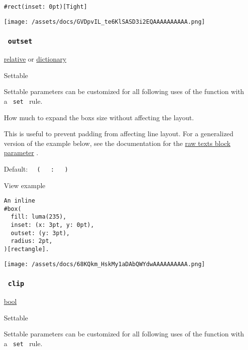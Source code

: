 \begin{verbatim}
#rect(inset: 0pt)[Tight]
\end{verbatim}

\texttt{[image: /assets/docs/GVDpvIL\_te6KlSASD3i2EQAAAAAAAAAA.png]}

\subsubsection{\texorpdfstring{\texttt{\ outset\ }}{ outset }}\label{parameters-outset}

\href{/docs/reference/layout/relative/}{relative} {or}
\href{/docs/reference/foundations/dictionary/}{dictionary}

{{ Settable }}

\label{parameters-outset-settable-tooltip}
Settable parameters can be customized for all following uses of the
function with a \texttt{\ set\ } rule.

How much to expand the box\textquotesingle s size without affecting the
layout.

This is useful to prevent padding from affecting line layout. For a
generalized version of the example below, see the documentation for the
\href{/docs/reference/text/raw/\#parameters-block}{raw
text\textquotesingle s block parameter} .

Default:
\texttt{\ }{\texttt{\ (\ }}\texttt{\ }{\texttt{\ :\ }}\texttt{\ }{\texttt{\ )\ }}\texttt{\ }


View example

\begin{verbatim}
An inline
#box(
  fill: luma(235),
  inset: (x: 3pt, y: 0pt),
  outset: (y: 3pt),
  radius: 2pt,
)[rectangle].
\end{verbatim}

\texttt{[image: /assets/docs/68KQkm\_HskMy1aDAbQWYdwAAAAAAAAAA.png]}

\subsubsection{\texorpdfstring{\texttt{\ clip\ }}{ clip }}\label{parameters-clip}

\href{/docs/reference/foundations/bool/}{bool}

{{ Settable }}

\label{parameters-clip-settable-tooltip}
Settable parameters can be customized for all following uses of the
function with a \texttt{\ set\ } rule.

